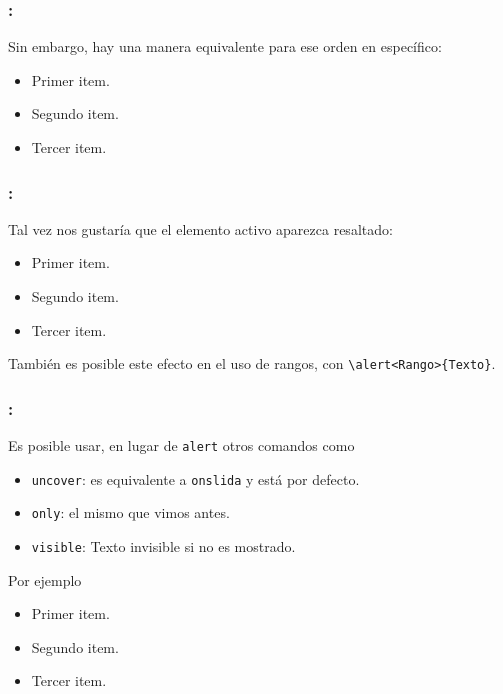 \documentclass[11pt]{beamer}	%
\begin{document}
\begin{frame}
	\frametitle{\secname : \subsecname}
	
	Sin embargo, hay una manera equivalente para ese orden en específico:
		\begin{block}{}
		\begin{itemize}[<+->]
			\item Primer item.
			\item Segundo item.
			\item Tercer item.
		\end{itemize}
		\end{block}
\end{frame}

\begin{frame}
	
	\frametitle{\secname : \subsecname}
	
	Tal vez nos gustaría que el elemento activo aparezca resaltado:
		\begin{block}{}
		\begin{itemize}[<+- | alert@+>]
			\item Primer item.
			\item Segundo item.
			\item Tercer item.
		\end{itemize}
		\end{block}
	
	También es posible este efecto en el uso de rangos, con \texttt{\textbackslash alert<Rango>\{Texto\}}.
\end{frame}

\begin{frame}
	\frametitle{\secname : \subsecname}
	
	\begin{block}{}
	Es posible usar, en lugar de \texttt{alert} otros comandos como
		\begin{itemize}
			\item \texttt{uncover}: es equivalente a \texttt{onslida} y está por defecto.
			\item \texttt{only}: el mismo que vimos antes.
			\item \texttt{visible}: Texto invisible si no es mostrado.
		\end{itemize}
	\end{block}
	
	Por ejemplo
		\begin{itemize}[<+- | only@+>]
			\item Primer item.
			\item Segundo item.
			\item Tercer item.
		\end{itemize}
\end{frame}
\end{document}
